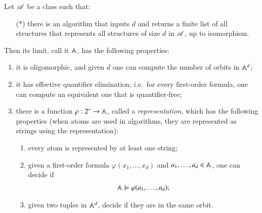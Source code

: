 \begin{theorem}\label{thm:computable-fraisse}
	Let $\mathscr A$ be a \fraisse class such that: 
	\begin{itemize}
		\item[(*)] there  is an algorithm that inputs $d$ and returns a finite list of all structures that represents all structures of size $d$ in $\mathscr A$, up to isomorphism.
	\end{itemize}
	Then its \fraisse limit, call it $\mathbb A$, has the following properties: 
	\begin{enumerate}
		\item \label{item:fraisse-lim-oligo} it is oligomorphic, and given $d$ one can compute the number of orbits in $\mathbb A^d$;
		\item \label{item:fraisse-lim-effective-quantifier-elim} it has effective quantifier elimination, i.e.~for every first-order formula, one can compute an equivalent one that is quantifier-free;
		\item \label{item:fraisse-lim-represenation} 	there is a function $
		\rho : 2^* \to \mathbb A$, called a \emph{representation}, which has the following properties (when atoms are used in algorithms, they are represented as strings using the representation):
		\begin{enumerate}
			\item \label{item:fraisse-lim-representation-surjective} every atom is represented by at least one string;
			\item \label{item:fraisse-lim-represenation-fo-theory} given a first-order formula $\varphi(x_1,\ldots,x_d)$ and $a_1,\ldots,a_d \in \mathbb A$, one can decide if 
			\begin{align*}
			\mathbb A \models \varphi(a_1,\ldots,a_d);
			\end{align*}
			\item \label{item:fraisse-lim-represenation-same-orbit} given two tuples in $\mathbb A^d$,  decide if they are in the same orbit.
		\end{enumerate}
	\end{enumerate}

\end{theorem}
